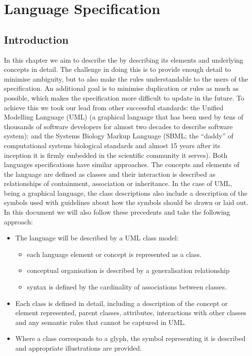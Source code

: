 

\chapter{Language Specification}
\label{chp:glyphs}

\section{Introduction}
\label{sec:lang-intro}

In this chapter we aim to describe the \PDl by describing its elements
and underlying concepts in detail. The challenge in doing this is to
provide enough detail to minimise ambiguity, but to also make the
rules understandable to the users of the specification. An additional
goal is to minimise duplication or rules as much as possible, which
makes the specification more difficult to update in the future. To
achieve this we took our lead from other successful standards: the
Unified Modelling Language (UML) \cite{umlspec} (a graphical
language that has been used by tens of thousands of software
developers for almost two decades to describe software system); and the
Systems Biology Markup Language \cite{sbmll3core}  (SBML; the ``daddy'' of computational systems
biological standards and almost 15 years after its inception it is firmly
embedded in the scientific community it serves). Both languages
specifications have similar approaches. The concepts and elements of
the language are defined as classes and their interaction is described
as relationships of containment, association or inheritance. In the
case of UML, being a graphical language, the class descriptions also
include a description of the symbols used with guidelines about how
the symbols should be drawn or laid out. In this document we will also
follow these precedents and take the following approach:

\begin{itemize}
\item The language will be described by a UML class model:
  \begin{itemize}
  \item each language element or concept is represented as a
    class.
  \item conceptual organisation is described by a generalisation relationship
  \item syntax is defined by the cardinality of associations between classes.
  \end{itemize}
\item Each class is defined in detail, including a description of the concept or
  element represented, parent classes, attributes, interactions with
  other classes and any semantic rules that cannot be captured in UML.
\item Where a class corresponds to a glyph, the symbol representing it
  is described and appropriate illustrations are provided.
\end{itemize}

